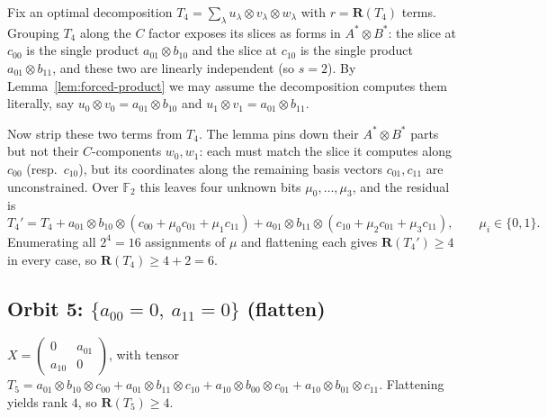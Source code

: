 \documentclass[11pt]{article}
\theoremstyle{definition}
\newcommand{\F}{\mathbb{F}}
\newcommand{\R}{\mathbf{R}}
\begin{document}
Fix an optimal decomposition $T_4=\sum_{\lambda} u_\lambda\otimes v_\lambda\otimes
w_\lambda$ with $r=\R(T_4)$ terms. Grouping $T_4$ along the $C$ factor exposes its
slices as forms in $A^*\otimes B^*$: the slice at $c_{00}$ is the single product
$a_{01}\otimes b_{10}$ and the slice at $c_{10}$ is the single product
$a_{01}\otimes b_{11}$, and these two are linearly independent (so $s=2$). By
Lemma~\ref{lem:forced-product} we may assume the decomposition computes them
literally, say $u_0\otimes v_0=a_{01}\otimes b_{10}$ and
$u_1\otimes v_1=a_{01}\otimes b_{11}$.

Now strip these two terms from $T_4$. The lemma pins down their $A^*\otimes B^*$ parts
but not their $C$-components $w_0,w_1$: each must match the slice it computes along
$c_{00}$ (resp.\ $c_{10}$), but its coordinates along the remaining basis vectors
$c_{01},c_{11}$ are unconstrained. Over $\F_2$ this leaves four unknown bits
$\mu_0,\dots,\mu_3$, and the residual is
\[
  T_4'=T_4+a_{01}\otimes b_{10}\otimes(c_{00}+\mu_0 c_{01}+\mu_1 c_{11})
  +a_{01}\otimes b_{11}\otimes(c_{10}+\mu_2 c_{01}+\mu_3 c_{11}),
  \qquad \mu_i\in\{0,1\}.
\]
Enumerating all $2^4=16$ assignments of $\mu$ and flattening each gives $\R(T_4')\ge 4$ in
every case, so $\R(T_4)\ge 4+2=6$.

\subsection*{Orbit 5: $\{a_{00}=0,\ a_{11}=0\}$ (flatten)}
$X=
\begin{pmatrix}0 & a_{01} \\a_{10}&0
\end{pmatrix}$, with tensor
$T_5=a_{01}\otimes b_{10}\otimes c_{00}+a_{01}\otimes b_{11}\otimes c_{10}
+a_{10}\otimes b_{00}\otimes c_{01}+a_{10}\otimes b_{01}\otimes c_{11}$.
Flattening yields rank $4$, so $\R(T_5)\ge 4$.
\end{document}
